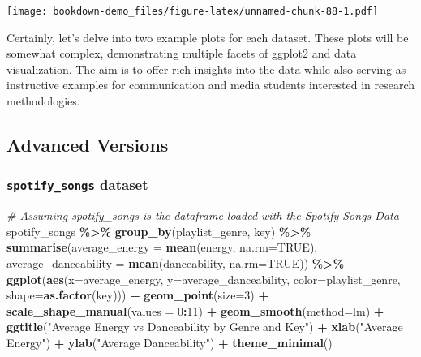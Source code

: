 \documentclass[
  b5paper]{book}
\newenvironment{Shaded}{\begin{snugshade}}{\end{snugshade}}
\newcommand{\AttributeTok}[1]{\textcolor[rgb]{0.13,0.29,0.53}{#1}}
\newcommand{\CommentTok}[1]{\textcolor[rgb]{0.56,0.35,0.01}{\textit{#1}}}
\newcommand{\ConstantTok}[1]{\textcolor[rgb]{0.56,0.35,0.01}{#1}}
\newcommand{\DecValTok}[1]{\textcolor[rgb]{0.00,0.00,0.81}{#1}}
\newcommand{\FunctionTok}[1]{\textcolor[rgb]{0.13,0.29,0.53}{\textbf{#1}}}
\newcommand{\NormalTok}[1]{#1}
\newcommand{\SpecialCharTok}[1]{\textcolor[rgb]{0.81,0.36,0.00}{\textbf{#1}}}
\newcommand{\StringTok}[1]{\textcolor[rgb]{0.31,0.60,0.02}{#1}}
\begin{document}
\texttt{[image: bookdown-demo\_files/figure-latex/unnamed-chunk-88-1.pdf]}

Certainly, let's delve into two example plots for each dataset. These plots will be somewhat complex, demonstrating multiple facets of ggplot2 and data visualization. The aim is to offer rich insights into the data while also serving as instructive examples for communication and media students interested in research methodologies.

\hypertarget{advanced-versions}{%
\subsection*{Advanced Versions}\label{advanced-versions}}

\hypertarget{spotify_songs-dataset-10}{%
\subsubsection*{\texorpdfstring{\texttt{spotify\_songs} dataset}{spotify\_songs dataset}}\label{spotify_songs-dataset-10}}

\begin{Shaded}
\begin{Highlighting}[]
\CommentTok{\# Assuming spotify\_songs is the dataframe loaded with the Spotify Songs Data}
\NormalTok{spotify\_songs }\SpecialCharTok{\%\textgreater{}\%}
  \FunctionTok{group\_by}\NormalTok{(playlist\_genre, key) }\SpecialCharTok{\%\textgreater{}\%}
  \FunctionTok{summarise}\NormalTok{(}\AttributeTok{average\_energy =} \FunctionTok{mean}\NormalTok{(energy, }\AttributeTok{na.rm=}\ConstantTok{TRUE}\NormalTok{),}
            \AttributeTok{average\_danceability =} \FunctionTok{mean}\NormalTok{(danceability, }\AttributeTok{na.rm=}\ConstantTok{TRUE}\NormalTok{)) }\SpecialCharTok{\%\textgreater{}\%}
  \FunctionTok{ggplot}\NormalTok{(}\FunctionTok{aes}\NormalTok{(}\AttributeTok{x=}\NormalTok{average\_energy, }\AttributeTok{y=}\NormalTok{average\_danceability, }\AttributeTok{color=}\NormalTok{playlist\_genre, }\AttributeTok{shape=}\FunctionTok{as.factor}\NormalTok{(key))) }\SpecialCharTok{+}
  \FunctionTok{geom\_point}\NormalTok{(}\AttributeTok{size=}\DecValTok{3}\NormalTok{) }\SpecialCharTok{+}
  \FunctionTok{scale\_shape\_manual}\NormalTok{(}\AttributeTok{values =} \DecValTok{0}\SpecialCharTok{:}\DecValTok{11}\NormalTok{) }\SpecialCharTok{+}
  \FunctionTok{geom\_smooth}\NormalTok{(}\AttributeTok{method=}\StringTok{\textquotesingle{}lm\textquotesingle{}}\NormalTok{) }\SpecialCharTok{+}
  \FunctionTok{ggtitle}\NormalTok{(}\StringTok{"Average Energy vs Danceability by Genre and Key"}\NormalTok{) }\SpecialCharTok{+}
  \FunctionTok{xlab}\NormalTok{(}\StringTok{"Average Energy"}\NormalTok{) }\SpecialCharTok{+}
  \FunctionTok{ylab}\NormalTok{(}\StringTok{"Average Danceability"}\NormalTok{) }\SpecialCharTok{+}
  \FunctionTok{theme\_minimal}\NormalTok{()}
\end{Highlighting}
\end{Shaded}
\end{document}
